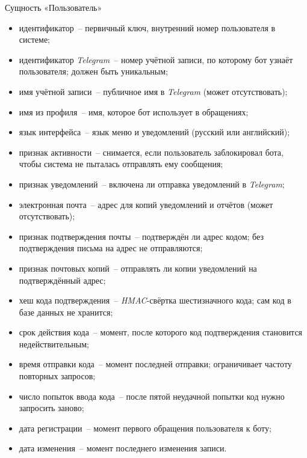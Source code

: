 Сущность «Пользователь»
\begin{itemize}
	\item идентификатор~-- первичный ключ, внутренний номер пользователя в системе;
	\item идентификатор \textit{Telegram}~-- номер учётной записи, по которому бот узнаёт пользователя; должен быть уникальным;
	\item имя учётной записи~-- публичное имя в \textit{Telegram} (может отсутствовать);
	\item имя из профиля~-- имя, которое бот использует в обращениях;
	\item язык интерфейса~-- язык меню и уведомлений (русский или английский);
	\item признак активности~-- снимается, если пользователь заблокировал бота, чтобы система не пыталась отправлять ему сообщения;
	\item признак уведомлений~-- включена ли отправка уведомлений в \textit{Telegram};
	\item электронная почта~-- адрес для копий уведомлений и отчётов (может отсутствовать);
	\item признак подтверждения почты~-- подтверждён ли адрес кодом; без подтверждения письма на адрес не отправляются;
	\item признак почтовых копий~-- отправлять ли копии уведомлений на подтверждённый адрес;
	\item хеш кода подтверждения~-- \textit{HMAC}-свёртка шестизначного кода; сам код в базе данных не хранится;
	\item срок действия кода~-- момент, после которого код подтверждения становится недействительным;
	\item время отправки кода~-- момент последней отправки; ограничивает частоту повторных запросов;
	\item число попыток ввода кода~-- после пятой неудачной попытки код нужно запросить заново;
	\item дата регистрации~-- момент первого обращения пользователя к боту;
	\item дата изменения~-- момент последнего изменения записи.
\end{itemize}

